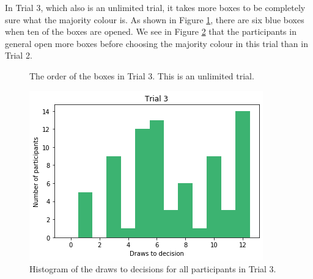 In Trial 3, which also is an unlimited trial, it takes more boxes to be completely sure what the majority colour is. As shown in Figure \ref{fig:trial3_order}, there are six blue boxes when ten of the boxes are opened. We see in Figure \ref{fig:histogram_trial3} that the participants in general open more boxes before choosing the majority colour in this trial than in Trial 2. 

\begin{figure}
    \centering
    \scalebox{0.8}{}
    \caption[Order of Boxes in Trial 3]{The order of the boxes in Trial 3. This is an unlimited trial.}
    \label{fig:trial3_order}
\end{figure}

\begin{figure}
    \centering
    \includegraphics[scale=0.6]{pictures/dtd3_histogram.png}
    \caption[Draws to Decisions in Trial 3]{Histogram of the draws to decisions for all participants in Trial 3.}
    \label{fig:histogram_trial3}
\end{figure}

